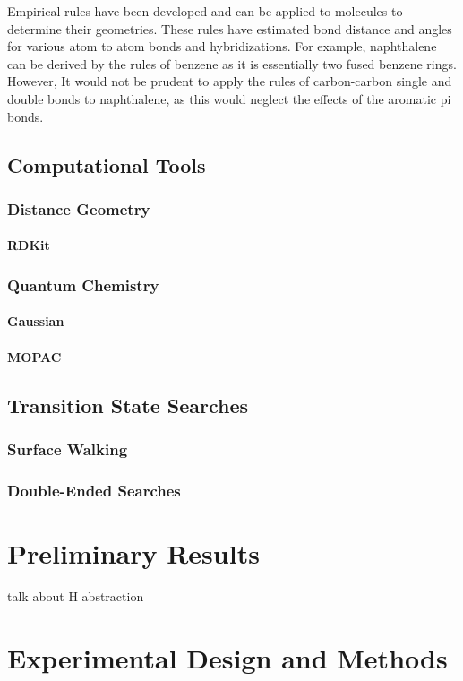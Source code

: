 \documentclass[12pt]{article}
\begin{document}
Empirical rules have been developed and can be applied to molecules to determine their geometries. These rules have estimated bond distance and angles for various atom to atom bonds and hybridizations. For example, naphthalene can be derived by the rules of benzene as it is essentially two fused benzene rings. However, It would not be prudent to apply the rules of carbon-carbon single and double bonds to naphthalene, as this would neglect the effects of the aromatic pi bonds.

\subsection{Computational Tools}
\subsubsection{Distance Geometry}
\paragraph{RDKit}
\subsubsection{Quantum Chemistry}
\paragraph{Gaussian}
\paragraph{MOPAC}
\subsection{Transition State Searches}
\subsubsection{Surface Walking}
\subsubsection{Double-Ended Searches}
\section{Preliminary Results}
talk about H abstraction

\section{Experimental Design and Methods}
\end{document}
